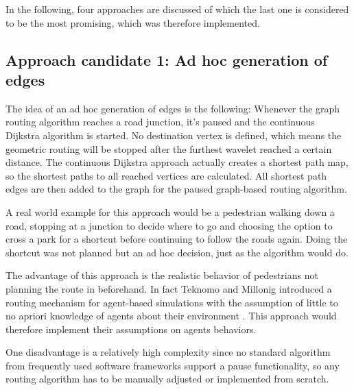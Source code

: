 	In the following, four approaches are discussed of which the last one is considered to be the most promising, which was therefore implemented.
	
	
	\subsection{Approach candidate 1: Ad hoc generation of edges}
	
		The idea of an ad hoc generation of edges is the following:
		Whenever the graph routing algorithm reaches a road junction, it's paused and the continuous Dijkstra algorithm is started.
		No destination vertex is defined, which means the geometric routing will be stopped after the furthest wavelet reached a certain distance.
		The continuous Dijkstra approach actually creates a shortest path map, so the shortest paths to all reached vertices are calculated.
		All shortest path edges are then added to the graph for the paused graph-based routing algorithm.
		
		A real world example for this approach would be a pedestrian walking down a road, stopping at a junction to decide where to go and choosing the option to cross a park for a shortcut before continuing to follow the roads again.
		Doing the shortcut was not planned but an ad hoc decision, just as the algorithm would do.
		
		The advantage of this approach is the realistic behavior of pedestrians not planning the route in beforehand.
		In fact Teknomo and Millonig introduced a routing mechanism for agent-based simulations with the assumption of little to no apriori knowledge of agents about their environment \cite{teknomo-millonig-routing}.
		This approach would therefore implement their assumptions on agents behaviors.
		
		One disadvantage is a relatively high complexity since no standard algorithm from frequently used software frameworks support a pause functionality, so any routing algorithm has to be manually adjusted or implemented from scratch.
		
